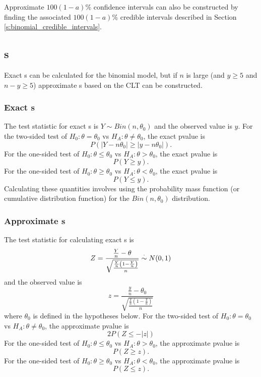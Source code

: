 Approximate $100(1-a)$\% confidence intervals can also be constructed by finding
the associated $100(1-a)$\% credible intervals described in Section 
\ref{s:binomial_credible_intervals}.


\subsection{\pvalue{}s}

Exact \pvalue{}s can be calculated for the binomial model, 
but if $n$ is large (and $y\ge 5$ and $n-y\ge 5$) 
approximate \pvalue{}s based on the CLT can be constructed.

\subsubsection{Exact \pvalue{}s}

The test statistic for exact \pvalue{}s is $Y\sim Bin(n,\theta_0)$ and
the observed value is $y$. 
For the two-sided test of $H_0: \theta=\theta_0$ vs $H_A: \theta\ne\theta_0$,
the exact pvalue is 
\[
P(|Y-n\theta_0|\ge |y-n\theta_0|).
\]
For the one-sided test of $H_0: \theta\le\theta_0$ vs $H_A: \theta>\theta_0$,
the exact pvalue is 
\[
P(Y\ge y).
\]
For the one-sided test of $H_0: \theta\ge\theta_0$ vs $H_A: \theta<\theta_0$,
the exact pvalue is 
\[
P(Y\le y).
\]
Calculating these quantities involves using the probability mass function 
(or cumulative distribution function) for the $Bin(n,\theta_0)$ distribution.

\subsubsection{Approximate \pvalue{}s}

The test statistic for calculating exact \pvalue{}s is 
\[
Z = \frac{\frac{Y}{n}-\theta}{\sqrt{\frac{\frac{Y}{n}\left(1-\frac{Y}{n}\right)}{n}}} \stackrel{\cdot}{\sim} 
N(0,1)
\]
and the observed value is 
\begin{equation}
z = \frac{\frac{y}{n}-\theta_0}{\sqrt{\frac{\frac{y}{n}\left(1-\frac{y}{n}\right)}{n}}}
\end{equation}
where $\theta_0$ is defined in the hypotheses below.
For the two-sided test of $H_0: \theta=\theta_0$ vs $H_A: \theta\ne\theta_0$,
the approximate pvalue is 
\[
2P(Z\le -|z|)
\]
For the one-sided test of $H_0: \theta\le\theta_0$ vs $H_A: \theta>\theta_0$,
the approximate pvalue is 
\[
P(Z\ge z).
\]
For the one-sided test of $H_0: \theta\ge\theta_0$ vs $H_A: \theta<\theta_0$,
the approximate pvalue is 
\[
P(Z\le z).
\]
